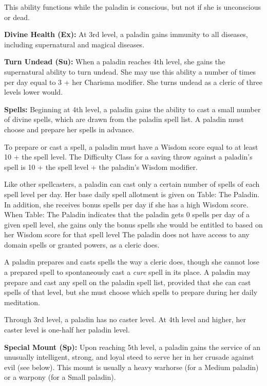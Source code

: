 This ability functions while the paladin is conscious, but not if she is unconscious 
or dead.

\textbf{Divine Health (Ex):} At 3rd level, a paladin gains immunity to all diseases, 
including supernatural and magical diseases.

\textbf{Turn Undead (Su):} When a paladin reaches 4th level, she gains the supernatural 
ability to turn undead. She may use this ability a number of times per day equal 
to 3 + her Charisma modifier. She turns undead as a cleric of three levels lower 
would.

\textbf{Spells:} Beginning at 4th level, a paladin gains the ability to cast a 
small number of divine spells, which are drawn from the paladin spell list. A paladin 
must choose and prepare her spells in advance.

To prepare or cast a spell, a paladin must have a Wisdom score equal to at least 
10 + the spell level. The Difficulty Class for a saving throw against a paladin's 
spell is 10 + the spell level + the paladin's Wisdom modifier.

Like other spellcasters, a paladin can cast only a certain number of spells of 
each spell level per day. Her base daily spell allotment is given on Table: The 
Paladin. In addition, she receives bonus spells per day if she has a high Wisdom 
score. When Table: The Paladin indicates that the paladin gets 0 spells per day 
of a given spell level, she gains only the bonus spells she would be entitled to 
based on her Wisdom score for that spell level The paladin does not have access 
to any domain spells or granted powers, as a cleric does.

A paladin prepares and casts spells the way a cleric does, though she cannot lose 
a prepared spell to spontaneously cast a \textit{cure} spell in its place. A paladin 
may prepare and cast any spell on the paladin spell list, provided that she can 
cast spells of that level, but she must choose which spells to prepare during her 
daily meditation.

Through 3rd level, a paladin has no caster level. At 4th level and higher, her 
caster level is one-half her paladin level.

\textbf{Special Mount (Sp):} Upon reaching 5th level, a paladin 
gains the service of an unusually intelligent, strong, and loyal steed to serve 
her in her crusade against evil (see below). This mount is usually a heavy warhorse 
(for a Medium paladin) or a warpony (for a Small paladin).

